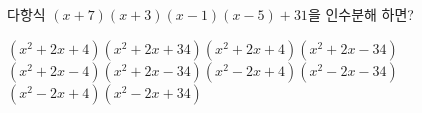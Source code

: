 다항식 $(x+7)(x+3)(x-1)(x-5)+31$을 인수분해 하면?
\begin{choicesv}{$(x^2+2x+4)(x^2+2x+34)$}{$(x^2+2x+4)(x^2+2x-34)$}{$(x^2+2x-4)(x^2+2x-34)$}{$(x^2-2x+4)(x^2-2x-34)$}{$(x^2-2x+4)(x^2-2x+34)$}\end{choicesv}
